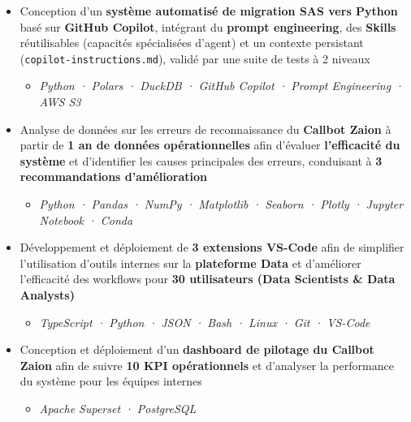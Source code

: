 \documentclass[10pt,english,french]{article}
\begin{document}
\begin{itemize}[leftmargin=0.5cm, label=\textbullet, itemsep=0.0625em]
    \item Conception d'un \textbf{système automatisé de migration SAS vers Python}
          basé sur \textbf{GitHub Copilot}, intégrant du \textbf{prompt engineering},
          des \textbf{Skills} réutilisables (capacités spécialisées d'agent) et un contexte
          persistant (\texttt{copilot-instructions.md}), validé par une suite de tests à 2 niveaux
          \begin{itemize}[leftmargin=0.25cm,label=\textendash,itemsep=0em,topsep=0.2em]
              \item \textit{\fontsize{10pt}{9pt}\selectfont Python · Polars · DuckDB · GitHub Copilot · Prompt Engineering · AWS S3}
          \end{itemize}

    \item Analyse de données sur les erreurs de reconnaissance du \textbf{Callbot Zaion}
          à partir de \textbf{1 an de données opérationnelles} afin d'évaluer
          \textbf{l'efficacité du système} et d'identifier les causes principales des erreurs,
          conduisant à \textbf{3 recommandations d'amélioration}
          \begin{itemize}[leftmargin=0.25cm,label=\textendash,itemsep=0em,topsep=0.2em]
              \item \textit{\fontsize{10pt}{9pt}\selectfont Python · Pandas · NumPy · Matplotlib · Seaborn · Plotly · Jupyter Notebook · Conda}
          \end{itemize}

    \item Développement et déploiement de \textbf{3 extensions VS-Code} afin de simplifier
          l'utilisation d'outils internes sur la \textbf{plateforme Data} et d'améliorer
          l'efficacité des workflows pour \textbf{30\raisebox{0.20ex}{\small +} utilisateurs
              (Data Scientists \& Data Analysts)}
          \begin{itemize}[leftmargin=0.25cm,label=\textendash,itemsep=0em,topsep=0.2em]
              \item \textit{\fontsize{10pt}{9pt}\selectfont TypeScript · Python · JSON · Bash · Linux · Git · VS-Code}
          \end{itemize}

    \item Conception et déploiement d'un \textbf{dashboard de pilotage du Callbot Zaion}
          afin de suivre \textbf{10\raisebox{0.20ex}{\small +} KPI opérationnels} et
          d'analyser la performance du système pour les équipes internes
          \begin{itemize}[leftmargin=0.25cm,label=\textendash,itemsep=0em,topsep=0.2em]
              \item \textit{\fontsize{10pt}{9pt}\selectfont Apache Superset · PostgreSQL}
          \end{itemize}


\end{itemize}
\end{document}
